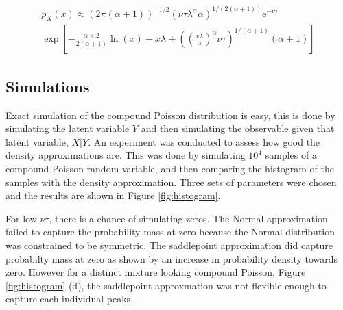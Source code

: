 \documentclass[a4paper]{proc}
\newcommand{\euler}{\mathrm{e}}
\begin{document}
\begin{figure*}[htb]
\begin{multline}
p_X(x)\approx
\left(2\pi(\alpha+1)\right)^{-1/2}\left(\nu\tau\lambda^\alpha\alpha\right)^{1/(2(\alpha+1))}\euler^{-\nu\tau}
\\
\exp\left[
-\frac{\alpha+2}{2(\alpha+1)}\ln(x)-x\lambda+\left(\left(\frac{x\lambda}{\alpha}\right)^{\alpha}\nu\tau\right)^{1/(\alpha+1)}(\alpha+1)
\right]
\label{eq:saddle_point_approx}
\end{multline}
\end{figure*}

\subsection{Simulations}
Exact simulation of the compound Poisson distribution is easy, this is done by simulating the latent variable $Y$ and then simulating the observable given that latent variable, $X|Y$. An experiment was conducted to assess how good the density approximations are. This was done by simulating $10^4$ samples of a compound Poisson random variable, and then comparing the histogram of the samples with the density approximation. Three sets of parameters were chosen and the results are shown in Figure \ref{fig:histogram}.

For low $\nu\tau$, there is a chance of simulating zeros. The Normal approximation failed to capture the probability mass at zero because the Normal distribution was constrained to be symmetric. The saddlepoint approximation did capture probabilty mass at zero as shown by an increase in probability density towards zero. However for a distinct mixture looking compound Poisson, Figure \ref{fig:histogram} (d), the saddlepoint approxmation was not flexible enough to capture each individual peaks.
\end{document}
